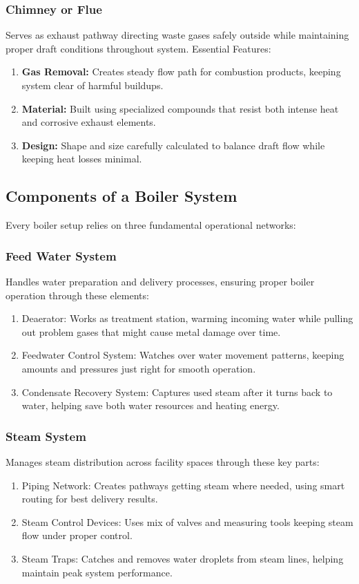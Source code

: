 \subsubsection{Chimney or Flue}
Serves as exhaust pathway directing waste gases safely outside while maintaining proper draft conditions throughout system.
Essential Features:
\begin{enumerate}
    \item \textbf{Gas Removal:} Creates steady flow path for combustion products, keeping system clear of harmful buildups.
    \item \textbf{Material:} Built using specialized compounds that resist both intense heat and corrosive exhaust elements.
    \item \textbf{Design:} Shape and size carefully calculated to balance draft flow while keeping heat losses minimal.
\end{enumerate}


\subsection{Components of a Boiler System}
Every boiler setup relies on three fundamental operational networks:

\subsubsection{Feed Water System}
Handles water preparation and delivery processes, ensuring proper boiler operation through these elements:
\begin{enumerate}
    \item Deaerator: Works as treatment station, warming incoming water while pulling out problem gases that might cause metal damage over time.
    \item Feedwater Control System: Watches over water movement patterns, keeping amounts and pressures just right for smooth operation.
    \item Condensate Recovery System: Captures used steam after it turns back to water, helping save both water resources and heating energy.
\end{enumerate}

\subsubsection{Steam System}
Manages steam distribution across facility spaces through these key parts:
\begin{enumerate}
    \item Piping Network: Creates pathways getting steam where needed, using smart routing for best delivery results.
    \item Steam Control Devices: Uses mix of valves and measuring tools keeping steam flow under proper control.
    \item Steam Traps: Catches and removes water droplets from steam lines, helping maintain peak system performance.
\end{enumerate}

